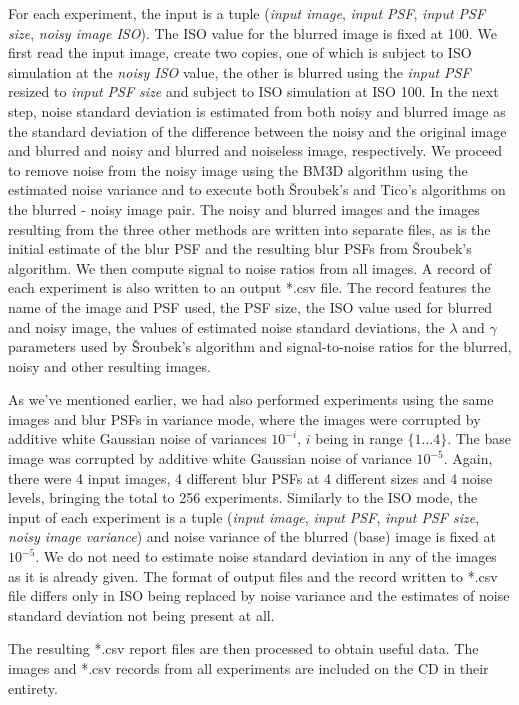 \documentclass[12pt,notitlepage]{report}
\begin{document}
For each experiment, the input is a tuple ({\em input image}, {\em input PSF}, {\em input PSF size}, {\em noisy image ISO}). The ISO value for the blurred image is fixed at 100. We first read the input image, create two copies, one of which is subject to ISO simulation at the {\em noisy ISO} value, the other is blurred using the {\em input PSF} resized to {\em input PSF size} and subject to ISO simulation at ISO 100. In the next step, noise standard deviation is estimated from both noisy and blurred image as the standard deviation of the difference between the noisy and the original image and blurred and noisy and blurred and noiseless image, respectively. We proceed to remove noise from the noisy image using the BM3D algorithm using the estimated noise variance and to execute both Šroubek's and Tico's algorithms on the blurred - noisy image pair. The noisy and blurred images and the images resulting from the three other methods are written into separate files, as is the initial estimate of the blur PSF and the resulting blur PSFs from Šroubek's algorithm. We then compute signal to noise ratios from all images. A record of each experiment is also written to an output *.csv file. The record features the name of the image and PSF used, the PSF size, the ISO value used for blurred and noisy image, the values of estimated noise standard deviations, the $\lambda$ and $\gamma$ parameters used by Šroubek's algorithm and signal-to-noise ratios for the blurred, noisy and other resulting images.  

As we've mentioned earlier, we had also performed experiments using the same images and blur PSFs in variance mode, where the images were corrupted by additive white Gaussian noise of variances $10^{-i}$, $i$ being in range $\lbrace 1 \dots 4 \rbrace$. The base image was corrupted by additive white Gaussian noise of variance $10^{-5}$. Again, there were 4 input images, 4 different blur PSFs at 4 different sizes and 4 noise levels, bringing the total to 256 experiments. Similarly to the ISO mode, the input of each experiment is a tuple ({\em input image}, {\em input PSF}, {\em input PSF size}, {\em noisy image variance}) and noise variance of the blurred (base) image is fixed at $10^{-5}$. We do not need to estimate noise standard deviation in any of the images as it is already given. The format of output files and the record written to *.csv file differs only in ISO being replaced by noise variance and the estimates of noise standard deviation not being present at all. 

The resulting *.csv report files are then processed to obtain useful data. The images and *.csv records from all experiments are included on the CD in their entirety.
\end{document}
